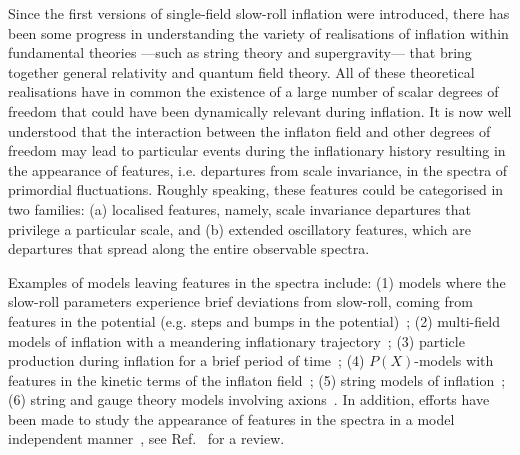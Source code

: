 \documentclass[12pt]{article}
\begin{document}
Since the first versions of single-field slow-roll inflation were introduced, there has been some progress in understanding the variety of realisations of inflation within fundamental theories ---such as string theory and supergravity--- that bring together general relativity and quantum field theory. All of these theoretical realisations have in common the existence of a large number of scalar degrees of freedom that could have been dynamically relevant during inflation. It is now well understood that the interaction between the inflaton field and other degrees of freedom may lead to particular events during the inflationary history resulting in the appearance of features, i.e. departures from scale invariance, in the spectra of primordial fluctuations. Roughly speaking, these features could be categorised in two families: (a) localised features, namely, scale invariance departures that privilege a particular scale, and (b) extended oscillatory features, which are departures that spread along the entire observable spectra.

Examples of models leaving features in the spectra include: (1) models where the slow-roll parameters experience brief deviations from slow-roll, coming from features in the potential (e.g. steps and bumps in the potential)~\cite{Starobinsky:1992ts,Adams:2001vc,Gong:2005jr,Chen:2006xjb, Hazra:2014goa, Hazra:2014jka, Hazra:2016fkm ,Cadavid:2015iya, GallegoCadavid:2017bzb, GallegoCadavid:2017pol, GallegoCadavid:2016wcz}; (2) multi-field models of inflation with a meandering inflationary trajectory~\cite{Achucarro:2010jv, Achucarro:2010da,Chen:2012ge,Pi:2012gf,Noumi:2013cfa,Burgess:2012dz,Battefeld:2013xka,Konieczka:2014zja,Mizuno:2014jja,Saito:2012pd,Gao:2013ota,Cespedes:2012hu,Shiu:2011qw,Gao:2012uq}; (3) particle production during inflation for a brief period of time~\cite{Chung:1999ve, Elgaroy:2003hp, Mathews:2004vu, Romano:2008rr, Barnaby:2009mc, Barnaby:2009dd, Barnaby:2010ke}; (4) $P(X)$-models with features in the kinetic terms of the inflaton field~\cite{Mooij:2015cxa}; (5) string models of inflation~\cite{Kobayashi:2012kc,Ashoorioon:2008qr,Cai:2015xla,Bean:2008na}; (6) string and gauge theory models involving axions~\cite{Wang:2002hf,Flauger:2009ab,Gariazzo:2017akm}. In addition, efforts have been made to study the appearance of features in the spectra in a model independent manner~\cite{Achucarro:2013cva, Achucarro:2014msa, Mooij:2016dsi, Palma:2016wqu, Gong:2014spa, Gong:2017vve, Gao:2015aba, Gong:2017yih, Gariazzo:2016blm, Gariazzo:2015qea, Appleby:2015bpw}, see Ref.~\cite{Chluba:2015bqa} for a review.
\end{document}
